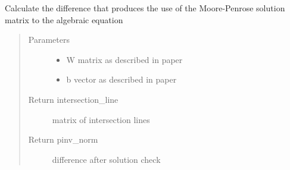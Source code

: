 \documentclass[letterpaper,12pt,english]{sphinxmanual}
\begin{document}

\begin{fulllineitems}
\label{\detokenize{functions:functions.mooore_penrose_solution}}
Calculate the difference that produces the use of the Moore-Penrose solution matrix to the algebraic equation
\begin{quote}\begin{description}
\item[{Parameters}] \leavevmode\begin{itemize}
\item {} 
 \textendash{} W matrix as described in paper

\item {} 
 \textendash{} b vector as described in paper

\end{itemize}

\item[{Return intersection\_line}] \leavevmode
matrix of intersection lines

\item[{Return pinv\_norm}] \leavevmode
difference after solution check

\end{description}\end{quote}

\end{fulllineitems}

\end{document}

